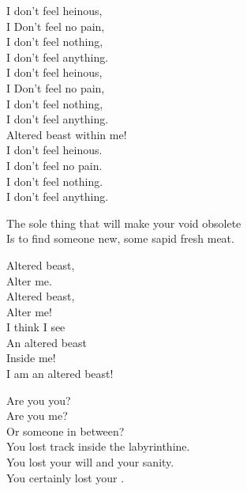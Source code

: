 I don't feel heinous, \\
I Don't feel no pain, \\
I don't feel nothing, \\
I don't feel anything. \\
I don't feel heinous, \\
I Don't feel no pain, \\
I don't feel nothing, \\
I don't feel anything. \\
Altered beast within me! \\

I don't feel heinous. \\
I don't feel no pain. \\
I don't feel nothing. \\
I don't feel anything. \\


The sole thing that will make your void obsolete \\
Is to find someone new, some sapid fresh meat. \\


Altered beast, \\
Alter me. \\
Altered beast, \\
Alter me! \\

I think I see \\
An altered beast \\
Inside me! \\

I am an altered beast! \\





Are you you? \\
Are you me? \\
Or someone in between? \\

You lost track inside the labyrinthine. \\
You lost your will and your sanity. \\
You certainly lost your . \\


